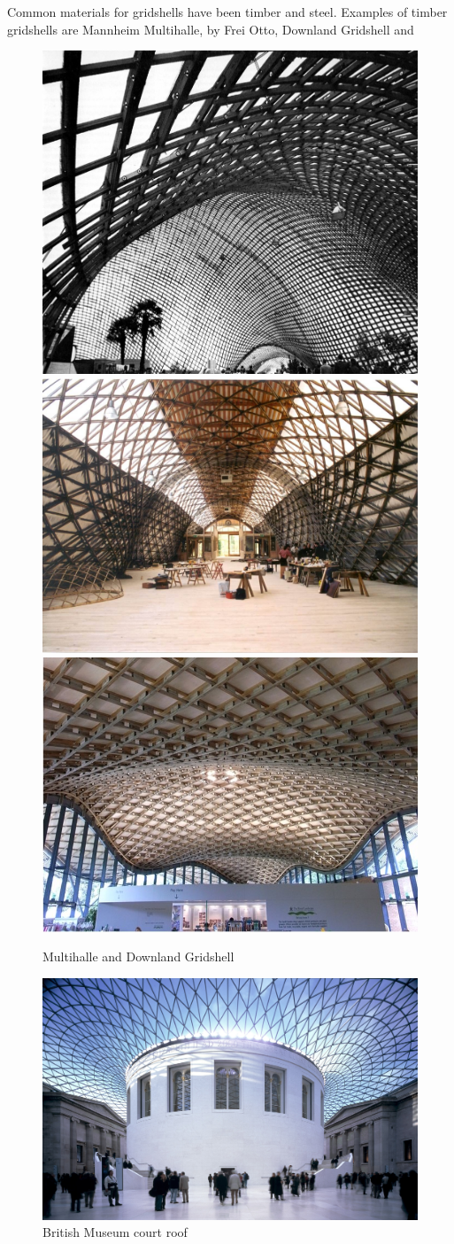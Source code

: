 Common materials for gridshells have been timber and steel. Examples of timber gridshells are Mannheim Multihalle, by Frei Otto, Downland Gridshell and 

\begin{figure}[H]
\centering
\includegraphics[width=0.3\linewidth ]{figure/Introduction/DownlandC.jpg}
\includegraphics[width=0.3\linewidth ]{figure/Introduction/Downland.jpg}
\includegraphics[width=0.3\linewidth ]{figure/Introduction/Savill.jpg}
\caption{Multihalle and Downland Gridshell}
\end{figure}

\begin{figure}[H]
\centering
\includegraphics[width=0.9\linewidth ]{figure/Introduction/TheGreatCourt.jpg}
\caption{British Museum court roof}
\end{figure}




